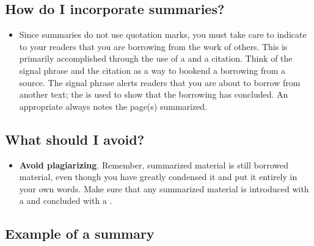 \subsection{How do I incorporate summaries?}

\begin{itemize}
\item Since summaries do not use quotation marks, you must take care to
indicate to your readers that you are borrowing from the work of others. This is primarily accomplished
through the use of a \hyperlink{signalphrase}{\color{Ahrenge}{signal phrase}} and a citation. Think of the signal phrase and the citation as a way to bookend a borrowing from a source. The signal phrase alerts readers that you are about to borrow from another text; the \hyperlink{citation}{\color{Ahrenge}{citation}} is used to show that the borrowing has concluded. An appropriate \hyperlink{citation}{\color{Ahrenge}{citation}} always notes the page(s) summarized.
\end{itemize}

\subsection{What should I avoid?}
\begin{itemize}

\item \textbf{Avoid plagiarizing}. Remember, summarized material
is still borrowed material, even though you have greatly condensed it and
put it entirely in your own words. Make sure that any summarized material is 
introduced with a \hyperlink{signalphrase}{\color{Ahrenge}{signal phrase}} and concluded with a \hyperlink{citation}{\color{Ahrenge}{citation}}.
\end{itemize}


\subsection{Example of a summary}


